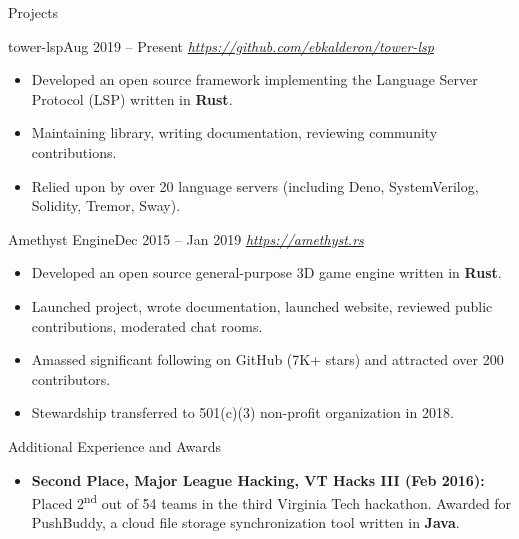 \documentclass[]{mcdowellcv}
\begin{document}
    \begin{cvsection}{Projects}
        \begin{cvsubsection}{tower-lsp}{}{Aug 2019 -- Present}
            \textit{\url{https://github.com/ebkalderon/tower-lsp}}
            \begin{itemize}
                \item Developed an open source framework implementing the Language Server Protocol (LSP) written in \textbf{Rust}.
                \item Maintaining library, writing documentation, reviewing community contributions.
                \item Relied upon by over 20 language servers (including Deno, SystemVerilog, Solidity, Tremor, Sway).
            \end{itemize}
        \end{cvsubsection}

        \begin{cvsubsection}{Amethyst Engine}{}{Dec 2015 -- Jan 2019}
            \textit{\url{https://amethyst.rs}}
            \begin{itemize}
                \item Developed an open source general-purpose 3D game engine written in \textbf{Rust}.
                \item Launched project, wrote documentation, launched website, reviewed public contributions, moderated chat rooms.
                \item Amassed significant following on GitHub (7K+ stars) and attracted over 200 contributors.
                \item Stewardship transferred to 501(c)(3) non-profit organization in 2018.
            \end{itemize}
        \end{cvsubsection}
    \end{cvsection}
    
    \begin{cvsection}{Additional Experience and Awards}
        \begin{cvsubsection}{}{}{}  
            \begin{itemize}
                \item \textbf{Second Place, Major League Hacking, VT Hacks III (Feb 2016):} Placed 2\textsuperscript{nd} out of 54 teams in the third Virginia Tech hackathon. Awarded for PushBuddy, a cloud file storage synchronization tool written in \textbf{Java}.
            \end{itemize}
        \end{cvsubsection}
    \end{cvsection}
    
\end{document}
